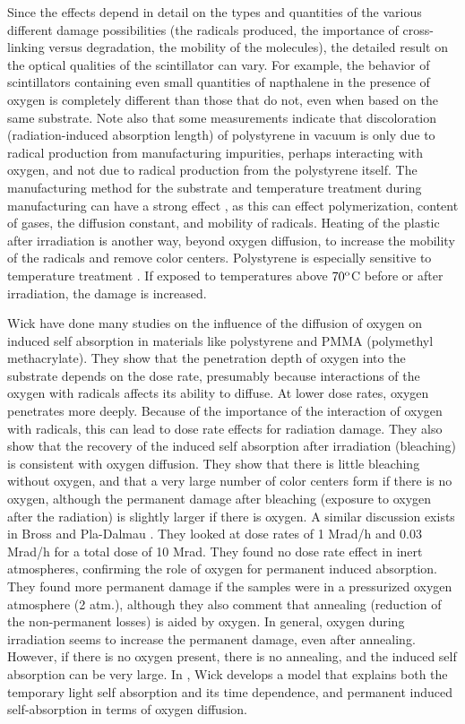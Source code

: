 Since the effects depend in detail on the types and quantities
of the various different damage possibilities (the radicals produced,
the importance of cross-linking versus degradation, the mobility of
the molecules), the detailed result on the optical qualities
of the scintillator can vary.
For example, the behavior of scintillators
containing even small quantities of napthalene in the presence of oxygen is completely
different than those that do not, even when based
on the same substrate\cite{Wick1991472}.
Note also that some measurements \cite{todd} indicate
that discoloration (radiation-induced absorption length) 
of polystyrene in vacuum is only due
to radical production from manufacturing impurities, perhaps
interacting with oxygen, and not due to radical production
from the polystyrene itself.
The manufacturing method for the substrate
and temperature treatment during manufacturing
can have a strong effect \cite{bicken} \cite{johnson},
as this can effect polymerization, content of gases, the
diffusion constant, and mobility of radicals.  Heating
of the plastic after irradiation is another way, beyond
oxygen diffusion, to increase
the mobility of the radicals and remove color centers.
Polystyrene is especially sensitive to temperature treatment
\cite{bicken}.  If exposed to temperatures above ${\rm 70^o}$C
before or after irradiation, the damage is increased.

Wick \etal \cite{Wick1991472}
have done many studies on the influence of the diffusion of oxygen on
induced self absorption
in materials like polystyrene and PMMA
(polymethyl methacrylate).  
They show that the penetration depth of oxygen into the substrate
depends on the dose rate, presumably because interactions
of the oxygen with radicals affects its ability to diffuse.  
At lower dose rates, oxygen penetrates
more deeply.  Because of the importance of the interaction
of oxygen with radicals, this can lead to dose rate effects
for radiation damage.  They also show that the recovery of the
induced self absorption after irradiation (bleaching)
is consistent with
oxygen diffusion.  They show that there is little bleaching
without oxygen, and that a very large number of color centers
form if there is no oxygen, although the permanent damage after
bleaching (exposure to oxygen after the radiation) is slightly
larger if there is oxygen.
A similar discussion exists in Bross and Pla-Dalmau \cite{173178}.
They looked at dose rates of 1 Mrad/h and 0.03 Mrad/h for a
total dose of 10 Mrad.  They found no dose rate effect in
inert atmospheres, confirming the role of oxygen for permanent
induced absorption.  They found more permanent damage if the samples
were in a pressurized oxygen atmosphere (2 atm.), although
they also comment that annealing (reduction of the non-permanent losses)
is aided by oxygen.
In general, oxygen during irradiation seems to increase the permanent
damage, even after annealing.  However, if there is no oxygen present,
there is no annealing, and the induced self absorption can be very large.
In \cite{Wulkop1995141}, Wick develops a model that explains
both the temporary light self absorption
and its time dependence, and permanent induced self-absorption in
terms of oxygen diffusion.


